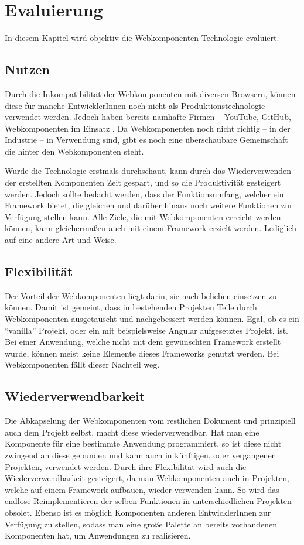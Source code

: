 \chapter{Evaluierung}
In diesem Kapitel wird objektiv die Webkomponenten Technologie evaluiert.

\section{Nutzen}
Durch die Inkompatibilität der Webkomponenten mit diversen Browsern, können diese für manche EntwicklerInnen noch nicht als Produktionstechnologie verwendet werden. Jedoch haben bereits namhafte Firmen -- YouTube, GitHub, \etc -- Webkomponenten im Einsatz \cite{webcomponents-production-use}. 
Da Webkomponenten noch nicht richtig -- in der Industrie -- in Verwendung sind, gibt es noch eine überschaubare Gemeinschaft die hinter den Webkomponenten steht. 

Wurde die Technologie erstmals durchschaut, kann durch das Wiederverwenden der erstellten Komponenten Zeit gespart, und so die Produktivität gesteigert werden. Jedoch sollte bedacht werden, dass der Funktionsumfang, welcher ein Framework bietet, die gleichen und darüber hinaus noch weitere Funktionen zur Verfügung stellen kann. Alle Ziele, die mit Webkomponenten erreicht werden können, kann gleichermaßen auch mit einem Framework erzielt werden. Lediglich auf eine andere Art und Weise. 

\section{Flexibilität}
Der Vorteil der Webkomponenten liegt darin, sie nach belieben einsetzen zu können. Damit ist gemeint, dass in bestehenden Projekten Teile durch Webkomponenten ausgetauscht und nachgebessert werden können. Egal, ob es ein "`vanilla"' Projekt, oder ein mit beispielsweise Angular aufgesetztes Projekt, ist. Bei einer Anwendung, welche nicht mit dem gewünschten Framework erstellt wurde, können meist keine Elemente dieses Frameworks genutzt werden. Bei Webkomponenten fällt dieser Nachteil weg.

\section{Wiederverwendbarkeit}

Die Abkapselung der Webkomponenten vom restlichen Dokument und prinzipiell auch dem Projekt selbst, macht diese wiederverwendbar. Hat man eine Komponente für eine  bestimmte Anwendung programmiert, so ist diese nicht zwingend an diese gebunden und kann auch in künftigen, oder vergangenen Projekten, verwendet werden. Durch ihre Flexibilität wird auch die Wiederverwendbarkeit gesteigert, da man Webkomponenten auch in Projekten, welche auf einem Framework aufbauen, wieder verwenden kann. So wird das endlose Reimplementieren der selben Funktionen in unterschiedlichen Projekten obsolet. Ebenso ist es möglich Komponenten anderen EntwicklerInnen zur Verfügung zu stellen, sodass man eine große Palette an bereits vorhandenen Komponenten hat, um Anwendungen zu realisieren.

